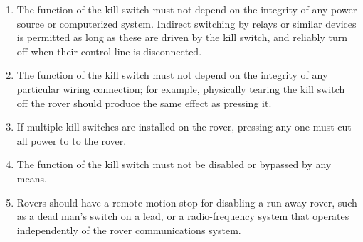 \begin{enumerate}
\begin{enumerate}
            \item The function of the kill switch must not depend on the integrity of any power source or computerized system. Indirect switching by relays or similar devices is permitted as long as these are driven by the kill switch, and reliably turn off when their control line is disconnected.
            \item The function of the kill switch must not depend on the integrity of any particular wiring connection; for example, physically tearing the kill switch off the rover should produce the same effect as pressing it.
            \item If multiple kill switches are installed on the rover, pressing any one must cut all power to to the rover.
            \item The function of the kill switch must not be disabled or bypassed by any means.
            \item Rovers should have a remote motion stop for disabling a run-away rover, such as a dead man’s switch on a lead, or a radio-frequency system that operates independently of the rover communications system.
        \end{enumerate}

    \clearpage


\end{enumerate}
